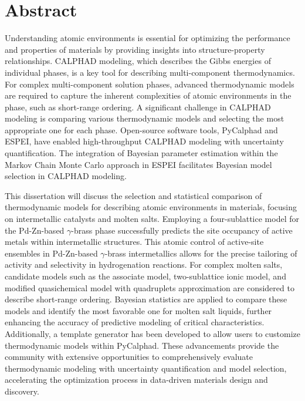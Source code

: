 \documentclass[letterpaper, 12pt]{report}
\begin{document}
\vfill

\newpage
\chapter*{Abstract}
Understanding atomic environments is essential for optimizing the performance and properties of materials by providing insights into structure-property relationships. CALPHAD modeling, which describes the Gibbs energies of individual phases, is a key tool for describing multi-component thermodynamics. For complex multi-component solution phases, advanced thermodynamic models are required to capture the inherent complexities of atomic environments in the phase, such as short-range ordering. A significant challenge in CALPHAD modeling is comparing various thermodynamic models and selecting the most appropriate one for each phase. Open-source software tools, PyCalphad and ESPEI, have enabled high-throughput CALPHAD modeling with uncertainty quantification. The integration of Bayesian parameter estimation within the Markov Chain Monte Carlo approach in ESPEI facilitates Bayesian model selection in CALPHAD modeling. 

This dissertation will discuss the selection and statistical comparison of thermodynamic models for describing atomic environments in materials, focusing on intermetallic catalysts and molten salts. Employing a four-sublattice model for the Pd-Zn-based $\gamma$-brass phase successfully predicts the site occupancy of active metals within intermetallic structures. This atomic control of active-site ensembles in Pd-Zn-based $\gamma$-brass intermetallics allows for the precise tailoring of activity and selectivity in hydrogenation reactions. For complex molten salts, candidate models such as the associate model, two-sublattice ionic model, and modified quasichemical model with quadruplets approximation are considered to describe short-range ordering. Bayesian statistics are applied to compare these models and identify the most favorable one for molten salt liquids, further enhancing the accuracy of predictive modeling of critical characteristics. Additionally, a template generator has been developed to allow users to customize thermodynamic models within PyCalphad. These advancements provide the community with extensive opportunities to comprehensively evaluate thermodynamic modeling with uncertainty quantification and model selection, accelerating the optimization process in data-driven materials design and discovery.

\newpage
\setcounter{tocdepth}{3}
\tableofcontents
\end{document}
